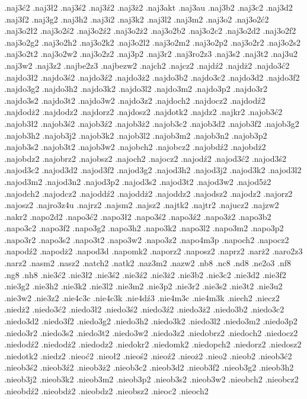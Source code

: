 {.naj3ć2
.naj3ł2
.naj3ś2
.naj3ź2
.naj3ż2
.naj3akt
.naj3au
.naj3b2
.naj3c2
.naj3d2
.naj3f2
.naj3g2
.naj3h2
.naj3i2
.naj3k2
.naj3l2
.naj3m2
.naj3o2
.naj3o2ć2
.naj3o2ł2
.naj3o2ś2
.naj3o2ź2
.naj3o2ż2
.naj3o2b2
.naj3o2c2
.naj3o2d2
.naj3o2f2
.naj3o2g2
.naj3o2h2
.naj3o2k2
.naj3o2l2
.naj3o2m2
.naj3o2p2
.naj3o2r2
.naj3o2s2
.naj3o2t2
.naj3o2w2
.naj3o2z2
.naj3p2
.naj3r2
.naj3ro2z3
.naj3s2
.naj3t2
.naj3u2
.naj3w2
.naj3z2
.najbe2z3
.najbezw2
.najch2
.najcz2
.najdź2
.najdż2
.najdo3ć2
.najdo3ł2
.najdo3ś2
.najdo3ź2
.najdo3ż2
.najdo3b2
.najdo3c2
.najdo3d2
.najdo3f2
.najdo3g2
.najdo3h2
.najdo3k2
.najdo3l2
.najdo3m2
.najdo3p2
.najdo3r2
.najdo3s2
.najdo3t2
.najdo3w2
.najdo3z2
.najdoch2
.najdocz2
.najdodź2
.najdodż2
.najdodz2
.najdorz2
.najdosz2
.najdotk2
.najdz2
.najkr2
.najob3ć2
.najob3ł2
.najob3ś2
.najob3ź2
.najob3ż2
.najob3c2
.najob3d2
.najob3f2
.najob3g2
.najob3h2
.najob3j2
.najob3k2
.najob3l2
.najob3m2
.najob3n2
.najob3p2
.najob3s2
.najob3t2
.najob3w2
.najobch2
.najobcz2
.najobdź2
.najobdż2
.najobdz2
.najobrz2
.najobsz2
.najoch2
.najocz2
.najodź2
.najod3ć2
.najod3ś2
.najod3c2
.najod3d2
.najod3f2
.najod3g2
.najod3h2
.najod3j2
.najod3k2
.najod3l2
.najod3m2
.najod3n2
.najod3p2
.najod3s2
.najod3t2
.najod3w2
.najod5ż2
.najodch2
.najodcz2
.najoddź2
.najoddż2
.najoddz2
.najodsz2
.najodz2
.najorz2
.najosz2
.najro3z4u
.najrz2
.najsm2
.najsz2
.najtk2
.najtr2
.najucz2
.najzw2
.nakr2
.napo2d2
.napo3ć2
.napo3ł2
.napo3ś2
.napo3ź2
.napo3ż2
.napo3b2
.napo3c2
.napo3f2
.napo3g2
.napo3h2
.napo3k2
.napo3l2
.napo3m2
.napo3p2
.napo3r2
.napo3s2
.napo3t2
.napo3w2
.napo3z2
.napo4m3p
.napoch2
.napocz2
.napodź2
.napodż2
.napod3d
.napomk2
.naporz2
.naposz2
.naprz2
.narż2
.naro2z3
.narz2
.nasm2
.nasz2
.natch2
.natk2
.naz3m2
.nazw2
.nb8
.nc8
.nd8
.ne2o3
.nf8
.ng8
.nh8
.nie3ć2
.nie3ł2
.nie3ś2
.nie3ź2
.nie3ż2
.nie3b2
.nie3c2
.nie3d2
.nie3f2
.nie3g2
.nie3h2
.nie3k2
.nie3l2
.nie3m2
.nie3p2
.nie3r2
.nie3s2
.nie3t2
.nie3u2
.nie3w2
.nie3z2
.nie4c3c
.nie4c3k
.nie4dź3
.nie4m3c
.nie4m3k
.niech2
.niecz2
.niedż2
.niedo3ć2
.niedo3ł2
.niedo3ś2
.niedo3ź2
.niedo3ż2
.niedo3b2
.niedo3c2
.niedo3d2
.niedo3f2
.niedo3g2
.niedo3h2
.niedo3k2
.niedo3l2
.niedo3m2
.niedo3p2
.niedo3r2
.niedo3s2
.niedo3t2
.niedo3w2
.niedo3z2
.niedobrz2
.niedoch2
.niedocz2
.niedodź2
.niedodż2
.niedodz2
.niedokr2
.niedomk2
.niedopch2
.niedorz2
.niedosz2
.niedotk2
.niedz2
.nieoć2
.nieoł2
.nieoś2
.nieoź2
.nieoż2
.nieo2
.nieob2
.nieob3ć2
.nieob3ś2
.nieob3ź2
.nieob3ż2
.nieob3c2
.nieob3d2
.nieob3f2
.nieob3g2
.nieob3h2
.nieob3j2
.nieob3k2
.nieob3m2
.nieob3p2
.nieob3s2
.nieob3w2
.nieobch2
.nieobcz2
.nieobdź2
.nieobdż2
.nieobdz2
.nieobsz2
.nieoc2
.nieoch2
}
